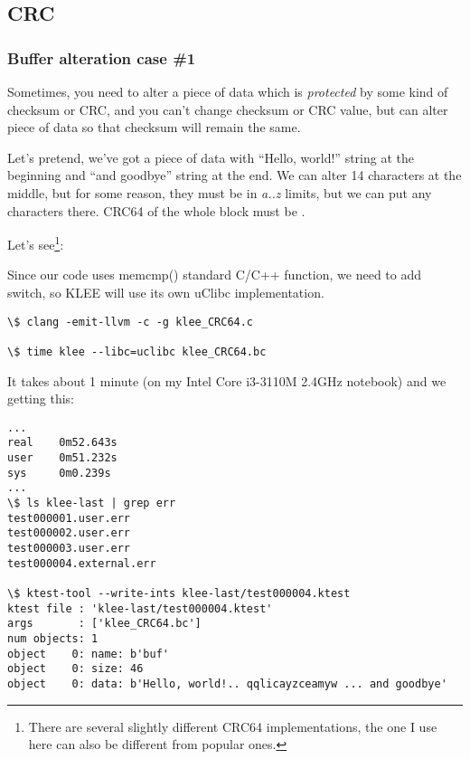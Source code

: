 \subsection{CRC} %

\subsubsection{Buffer alteration case \#1}

Sometimes, you need to alter a piece of data which is \textit{protected} by some kind of checksum or \ac{CRC}, and you can't change checksum or CRC value, but can alter piece of data so that checksum will remain the same.

Let's pretend, we've got a piece of data with ``Hello, world!'' string at the beginning and ``and goodbye'' string at the end.
We can alter 14 characters at the middle, but for some reason, they must be in \textit{a..z} limits, but we can put any characters there.
CRC64 of the whole block must be .

Let's see\footnote{There are several slightly different CRC64 implementations, the one I use here can also be different from popular ones.}:



Since our code uses memcmp() standard C/C++ function, we need to add  switch, so KLEE will use its own uClibc %
implementation. %

\begin{lstlisting}
\$ clang -emit-llvm -c -g klee_CRC64.c

\$ time klee --libc=uclibc klee_CRC64.bc
\end{lstlisting}

It takes about 1 minute (on my Intel Core i3-3110M 2.4GHz notebook) and we getting this:

\begin{lstlisting}
...
real    0m52.643s
user    0m51.232s
sys     0m0.239s
...
\$ ls klee-last | grep err
test000001.user.err
test000002.user.err
test000003.user.err
test000004.external.err

\$ ktest-tool --write-ints klee-last/test000004.ktest
ktest file : 'klee-last/test000004.ktest'
args       : ['klee_CRC64.bc']
num objects: 1
object    0: name: b'buf'
object    0: size: 46
object    0: data: b'Hello, world!.. qqlicayzceamyw ... and goodbye'
\end{lstlisting}

